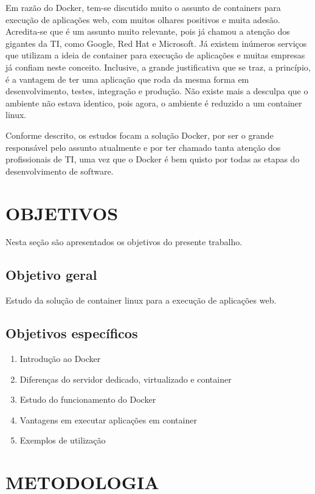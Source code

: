 \documentclass[
	12pt,				%
	openright,			%
	oneside,			%
	a4paper,			%
	chapter=TITLE,		%
	section=TITLE,		%
	english,			%
	french,				%
	spanish,			%
	brazil				%
	]{abntex2}
\begin{document}
Em razão do Docker, tem-se discutido muito o assunto de containers para execução de aplicações web, com muitos olhares positivos e muita adesão. Acredita-se que é um assunto muito relevante, pois já chamou a atenção dos gigantes da TI, como Google, Red Hat e Microsoft. Já existem inúmeros serviços que utilizam a ideia de container para execução de aplicações e muitas empresas já confiam neste conceito. Inclusive, a grande justificativa que se traz, a princípio, é a vantagem de ter uma aplicação que roda da mesma forma em desenvolvimento, testes, integração e produção. Não existe mais a desculpa que o ambiente não estava identico, pois agora, o ambiente é reduzido a um container linux.

Conforme descrito, os estudos focam a solução Docker, por ser o grande responsável pelo assunto atualmente e por ter chamado tanta atenção dos profissionais de TI, uma vez que o Docker é bem quisto por todas as etapas do desenvolvimento de software.

\section{OBJETIVOS}

Nesta seção são apresentados os objetivos do presente trabalho.

\subsection{Objetivo geral}

Estudo da solução de container linux para a execução de aplicações web.

\subsection{Objetivos específicos}

\begin{enumerate}
	\item{Introdução ao Docker}
	\item{Diferenças do servidor dedicado, virtualizado e container}
	\item{Estudo do funcionamento do Docker}
	\item{Vantagens em executar aplicações em container}
	\item{Exemplos de utilização}
\end{enumerate}

\section{METODOLOGIA}
\end{document}
